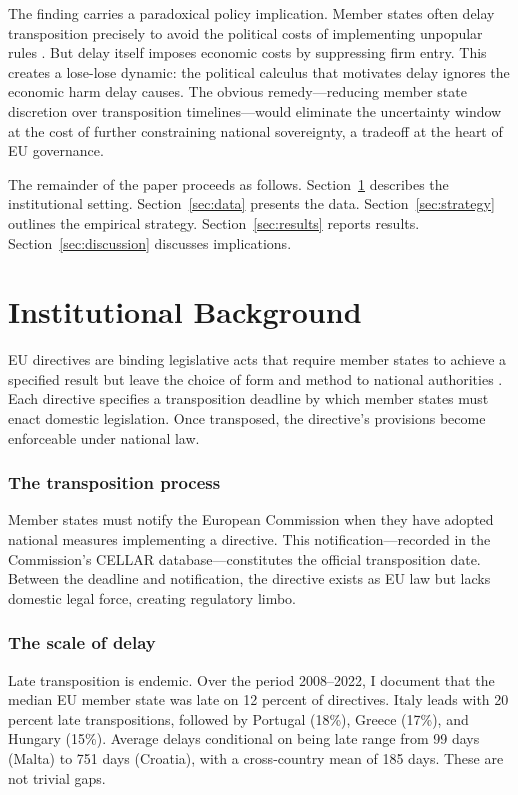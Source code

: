 \documentclass[12pt]{article}
\begin{document}
The finding carries a paradoxical policy implication. Member states often delay transposition precisely to avoid the political costs of implementing unpopular rules \citep{falkner2004}. But delay itself imposes economic costs by suppressing firm entry. This creates a lose-lose dynamic: the political calculus that motivates delay ignores the economic harm delay causes. The obvious remedy---reducing member state discretion over transposition timelines---would eliminate the uncertainty window at the cost of further constraining national sovereignty, a tradeoff at the heart of EU governance.

The remainder of the paper proceeds as follows. Section~\ref{sec:background} describes the institutional setting. Section~\ref{sec:data} presents the data. Section~\ref{sec:strategy} outlines the empirical strategy. Section~\ref{sec:results} reports results. Section~\ref{sec:discussion} discusses implications.


\section{Institutional Background}
\label{sec:background}

EU directives are binding legislative acts that require member states to achieve a specified result but leave the choice of form and method to national authorities \citep{craig2015}. Each directive specifies a transposition deadline by which member states must enact domestic legislation. Once transposed, the directive's provisions become enforceable under national law.

\subsubsection*{The transposition process} Member states must notify the European Commission when they have adopted national measures implementing a directive. This notification---recorded in the Commission's CELLAR database---constitutes the official transposition date. Between the deadline and notification, the directive exists as EU law but lacks domestic legal force, creating regulatory limbo.

\subsubsection*{The scale of delay} Late transposition is endemic. Over the period 2008--2022, I document that the median EU member state was late on 12 percent of directives. Italy leads with 20 percent late transpositions, followed by Portugal (18\%), Greece (17\%), and Hungary (15\%). Average delays conditional on being late range from 99 days (Malta) to 751 days (Croatia), with a cross-country mean of 185 days. These are not trivial gaps.
\end{document}
